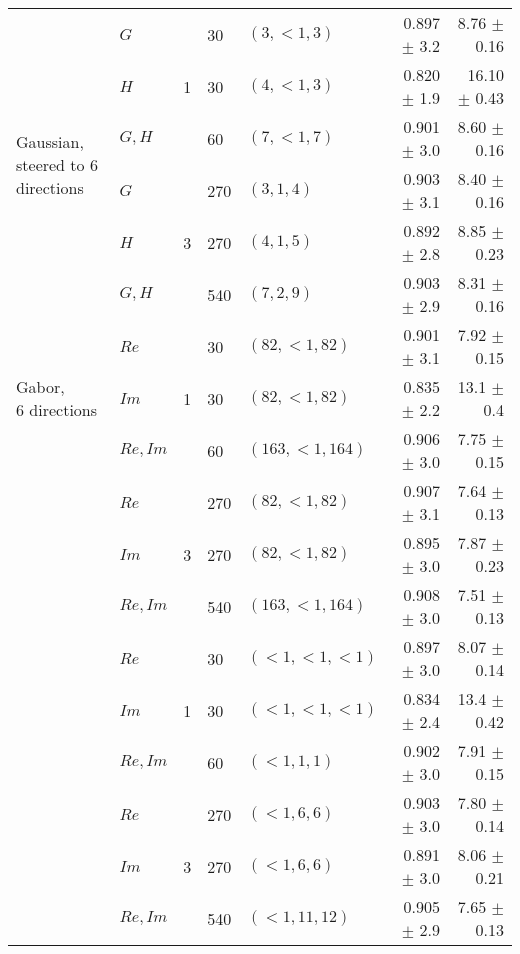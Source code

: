 \begin{tabularx}{\linewidth}{p{3cm} X X X X r r}
\midrule
\multirow{6}{3cm}{Gaussian, \newline steered to 6 directions}
            & $G$                   & \multirow{3}{1cm}{ 1 }
                                    &      30 &$(3, {<}1, 3)$     & 0.897 $\pm$ 3.2   & 8.76 $\pm$ 0.16 \\
            & $H$                   &&     30 &$(4, {<}1, 3)$     & 0.820 $\pm$ 1.9   & 16.10 $\pm$ 0.43\\
            & $G,H$                 &&     60 &$(7, {<}1, 7)$     & 0.901 $\pm$ 3.0   & 8.60 $\pm$ 0.16 \\
            & $G$                   & \multirow{3}{1cm}{ 3 }
                                    &     270 &$(3, 1, 4)$      & 0.903 $\pm$ 3.1   & 8.40 $\pm$ 0.16 \\
            & $H$                   &&    270 &$(4, 1, 5)$      & 0.892 $\pm$ 2.8   & 8.85 $\pm$ 0.23 \\
            & $G,H$                 &&    540 &$(7, 2, 9)$      & 0.903 $\pm$ 2.9   & 8.31 $\pm$ 0.16 \\
\midrule
\multirow{3}{3cm}{Gabor, \newline 6 directions}
            & $Re$                  & \multirow{3}{1cm}{ 1 }
                                    &      30 &$(82, {<}1, 82)$   & 0.901 $\pm$ 3.1   & 7.92 $\pm$ 0.15 \\
            & $Im$                  &&     30 &$(82, {<}1, 82)$   & 0.835 $\pm$ 2.2   & 13.1 $\pm$ 0.4  \\
            & $Re,Im$               &&     60 &$(163, {<}1, 164)$ & 0.906 $\pm$ 3.0   & 7.75 $\pm$ 0.15 \\
            & $Re$                  & \multirow{3}{1cm}{ 3 }
                                    &     270 &$(82, {<}1, 82)$   & 0.907 $\pm$ 3.1   & 7.64 $\pm$ 0.13 \\
            & $Im$                  &&    270 &$(82, {<}1, 82)$   & 0.895 $\pm$ 3.0   & 7.87 $\pm$ 0.23 \\
            & $Re,Im$               &&    540 &$(163, {<}1, 164)$ & 0.908 $\pm$ 3.0   & 7.51 $\pm$ 0.13 \\
\midrule
\multirow{3}{3cm}{\dtcwt{}}
            & $Re$                  & \multirow{3}{1cm}{ 1 }
                                    &      30 & $({<}1, {<}1, {<}1)$  & 0.897 $\pm$ 3.0   &  8.07 $\pm$ 0.14  \\
            & $Im$                  &&     30 & $({<}1, {<}1, {<}1)$  & 0.834 $\pm$ 2.4   &  13.4 $\pm$ 0.42 \\
            & $Re,Im$               &&     60 & $({<}1, 1, 1)$    & 0.902 $\pm$ 3.0   &  7.91 $\pm$ 0.15 \\
            & $Re$                  & \multirow{3}{1cm}{ 3 }
                                    &     270 & $({<}1, 6, 6)$    & 0.903 $\pm$ 3.0   & 7.80 $\pm$ 0.14 \\
            & $Im$                  &&    270 & $({<}1, 6, 6)$    & 0.891 $\pm$ 3.0   & 8.06 $\pm$ 0.21 \\
            & $Re,Im$               &&    540 & $({<}1, 11, 12)$  & 0.905 $\pm$ 2.9   & 7.65 $\pm$ 0.13 \\


\end{tabularx}
